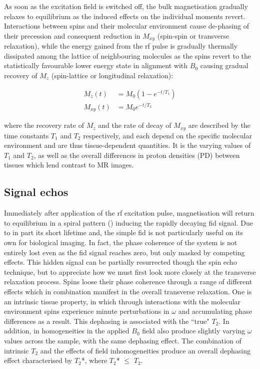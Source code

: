 As soon as the excitation field is switched off, the bulk magnetisation gradually relaxes to equilibrium as the induced effects on the individual moments revert.
Interactions between spins and their molecular environment cause de-phasing of their precession and consequent reduction in $M_{xy}$ (spin-spin or transverse relaxation), while the energy gained from the \gls{rf} pulse is gradually thermally dissipated among the lattice of neighbouring molecules as the spins revert to the statistically favourable lower energy state in alignment with $B_0$ causing gradual recovery of $M_z$ (spin-lattice or longitudinal relaxation):

\begin{align}
  M_z(t)  &= M_0 (1-e^{-t/T_1}) \\
  M_{xy}(t) &= M_0 e^{-t/T_2} \label{eq:recovery}
\end{align}

where the recovery rate of $M_z$ and the rate of decay of $M_{xy}$ are described by the time constants $T_1$ and $T_2$ respectively, and each depend on the specific molecular environment and are thus tissue-dependent quantities.
It is the varying values of $T_1$ and $T_2$, as well as the overall differences in proton densities (PD) between tissues which lend contrast to MR images.

\subsection{Signal echos}\label{sec:echos}

Immediately after application of the \gls{rf} excitation pulse, magnetisation will return to equilibrium in a spiral pattern () inducing the rapidly decaying \gls{fid} signal.
Due to in part its short lifetime and, the simple \gls{fid} is not particularly useful on its own for biological imaging.
In fact, the phase coherence of the system is not entirely lost even as the \gls{fid} signal reaches zero, but only masked by competing effects.
This hidden signal can be partially resurrected though the spin echo technique, but to appreciate how we must first look more closely at the transverse relaxation process.
Spins loose their phase coherence through a range of different effects which in combination manifest in the overall transverse relaxation.
One is an intrinsic tissue property, in which through interactions with the molecular environment spins experience minute perturbations in $\omega$ and accumulating phase differences as a result.
This dephasing is associated with the ``true" $T_2$.
In addition, in homogeneities in the applied $B_0$ field also produce slightly varying $\omega$ values across the sample, with the same dephasing effect.
The combination of intrinsic $T_2$ and the effects of field inhomogeneities produce an overall dephasing effect characterised by $T_2$*, where  $T_2$* $\leqslant$ $T_2$.


